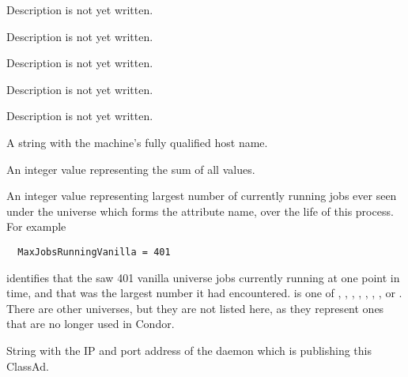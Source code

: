 \begin{description}
\item[\AdAttr{HostsClaimed}:] Description is not yet written.

\item[\AdAttr{HostsOwner}:] Description is not yet written.

\item[\AdAttr{HostsTotal}:] Description is not yet written.

\item[\AdAttr{HostsUnclaimed}:] Description is not yet written.

\item[\AdAttr{IdleJobs}:] Description is not yet written.

\item[\AdAttr{Machine}:] A string with the machine's fully qualified 
  host name.

\item[\AdAttr{MaxJobsRunning<universe}:] An integer value representing 
  the sum of all  values.

\item[\AdAttr{MaxJobsRunning<universe>}:] An integer value representing 
  largest number of currently running jobs ever seen
  under the universe which forms the attribute name, 
  over the life of this  process.
  For example
\begin{verbatim}
  MaxJobsRunningVanilla = 401
\end{verbatim}
  identifies that the  saw 401 vanilla universe jobs
  currently running at one point in time, and that was the largest
  number it had encountered.
   is one of 
  , , , ,
  , , , or .
  There are other universes, but they are not listed here, as they represent
  ones that are no longer used in Condor.

\item[\AdAttr{MyAddress}:] String with the IP and port address of the
 daemon which is publishing this ClassAd.


\end{description}
